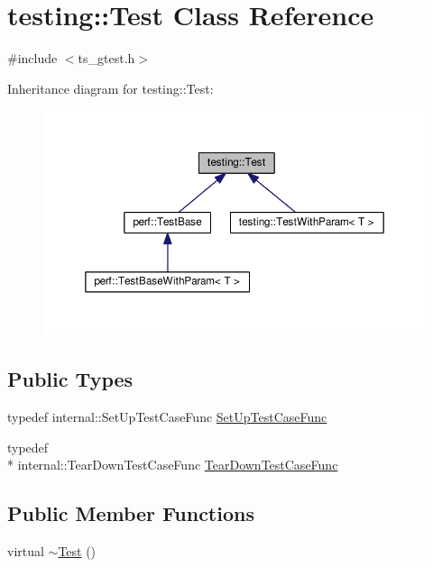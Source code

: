 \hypertarget{classtesting_1_1Test}{\section{testing\-:\-:Test Class Reference}
\label{classtesting_1_1Test}
}


{\ttfamily \#include $<$ts\-\_\-gtest.\-h$>$}



Inheritance diagram for testing\-:\-:Test\-:\nopagebreak
\begin{figure}[H]
\begin{center}
\leavevmode
\includegraphics[width=350pt]{classtesting_1_1Test__inherit__graph}
\end{center}
\end{figure}
\subsection*{Public Types}
\begin{DoxyCompactItemize}
\item 
typedef internal\-::\-Set\-Up\-Test\-Case\-Func \hyperlink{classtesting_1_1Test_a5f2a051d1d99c9b784c666c586186cf9}{Set\-Up\-Test\-Case\-Func}
\item 
typedef \\*
internal\-::\-Tear\-Down\-Test\-Case\-Func \hyperlink{classtesting_1_1Test_aa0f532e93b9f3500144c53f31466976c}{Tear\-Down\-Test\-Case\-Func}
\end{DoxyCompactItemize}
\subsection*{Public Member Functions}
\begin{DoxyCompactItemize}
\item 
virtual \hyperlink{classtesting_1_1Test_ad99dc9b12208fd4bffc367f0a1e3df1b}{$\sim$\-Test} ()
\end{DoxyCompactItemize}
